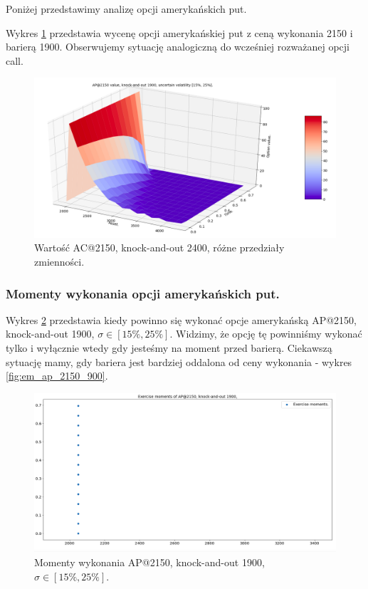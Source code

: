 \documentclass[12pt]{article}
\begin{document}
Poniżej przedstawimy analizę opcji amerykańskich put. 

Wykres \ref{fig:ap_2150_1900_uv} przedstawia wycenę opcji amerykańskiej put z ceną wykonania 2150 i barierą 1900. Obserwujemy sytuację analogiczną do wcześniej rozważanej opcji call. 

\begin{figure}[H]
    \centering
    \includegraphics[width=\textwidth,height=\textheight,keepaspectratio]{ap_2150_1900_uv.png}
    \caption{Wartość AC@2150, knock-and-out 2400, różne przedziały zmienności.}
    \label{fig:ap_2150_1900_uv}
\end{figure}

\subsubsection{Momenty wykonania opcji amerykańskich put.}

Wykres \ref{fig:em_ap_2150_1900} przedstawia kiedy powinno się wykonać opcje amerykańską AP@2150, knock-and-out 1900, $\sigma \in [15\%, 25\%].$ Widzimy, że opcję tę powinniśmy wykonać tylko i wyłącznie wtedy gdy jesteśmy na moment przed barierą.  Ciekawszą sytuację mamy, gdy bariera jest bardziej oddalona od ceny wykonania - wykres \ref{fig:em_ap_2150_900}.

\begin{figure}[H]
    \centering
    \includegraphics[width=\textwidth,height=\textheight,keepaspectratio]{em_ap_2150_1900.png}
    \caption{Momenty wykonania AP@2150, knock-and-out 1900, $\sigma \in [15\%, 25\%].$}
    \label{fig:em_ap_2150_1900}
\end{figure}
\end{document}
